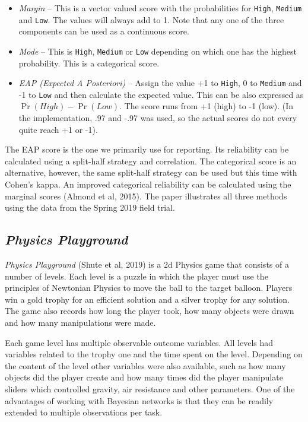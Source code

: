 \documentclass[]{article}
\begin{document}
\begin{itemize}
\item
  \emph{Margin} -- This is a vector valued score with the probabilities
  for \texttt{High}, \texttt{Medium} and \texttt{Low}. The values will
  always add to 1. Note that any one of the three components can be used
  as a continuous score.
\item
  \emph{Mode} -- This is \texttt{High}, \texttt{Medium} or \texttt{Low}
  depending on which one has the highest probability. This is a
  categorical score.
\item
  \emph{EAP (Expected A Posteriori)} -- Assign the value +1 to
  \texttt{High}, 0 to \texttt{Medium} and -1 to \texttt{Low} and then
  calculate the expected value. This can be also expressed as
  \(\Pr(High) -\Pr(Low)\). The score runs from +1 (high) to -1 (low).
  (In the implementation, .97 and -.97 was used, so the actual scores do
  not every quite reach +1 or -1).
\end{itemize}

The EAP score is the one we primarily use for reporting. Its reliability
can be calculated using a split-half strategy and correlation. The
categorical score is an alternative, however, the same split-half
strategy can be used but this time with Cohen's kappa. An improved
categorical reliability can be calculated using the marginal scores
(Almond et al, 2015). The paper illustrates all three methods using the
data from the Spring 2019 field trial.

\subsection{\texorpdfstring{\emph{Physics
Playground}}{Physics Playground}}\label{physics-playground}

\emph{Physics Playground} (Shute et al, 2019) is a 2d Physics game that
consists of a number of levels. Each level is a puzzle in which the
player must use the principles of Newtonian Physics to move the ball to
the target balloon. Players win a gold trophy for an efficient solution
and a silver trophy for any solution. The game also records how long the
player took, how many objects were drawn and how many manipulations were
made.

Each game level has multiple observable outcome variables. All levels
had variables related to the trophy one and the time spent on the level.
Depending on the content of the level other variables were also
available, such as how many objects did the player create and how many
times did the player manipulate sliders which controlled gravity, air
resistance and other parameters. One of the advantages of working with
Bayesian networks is that they can be readily extended to multiple
observations per task.
\end{document}

